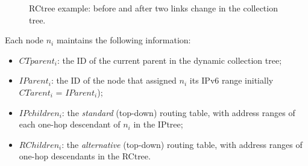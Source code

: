 \begin{figure}[!h]
\begin{center}
            \caption{RCtree example: before
            and after two links change in the collection tree.}\label{fig:layers}
\end{center}
\end{figure}

Each node $n_i$ maintains the following information:
\begin{itemize}
  \item $CTparent_i$: the ID of the current parent in the dynamic
  collection tree;
  \item $IParent_i$: the ID of the node that assigned $n_i$ its IPv6 range
initially $CTarent_i$ = $IParent_i$);
  \item $IPchildren_i$: the \textit{standard} (top-down) routing table, with
  address ranges of each one-hop descendant of $n_i$ in the IPtree;
  \item $RChildren_i$: the \textit{alternative} (top-down) routing table, with
  address ranges of one-hop descendants in the RCtree.
\end{itemize}

